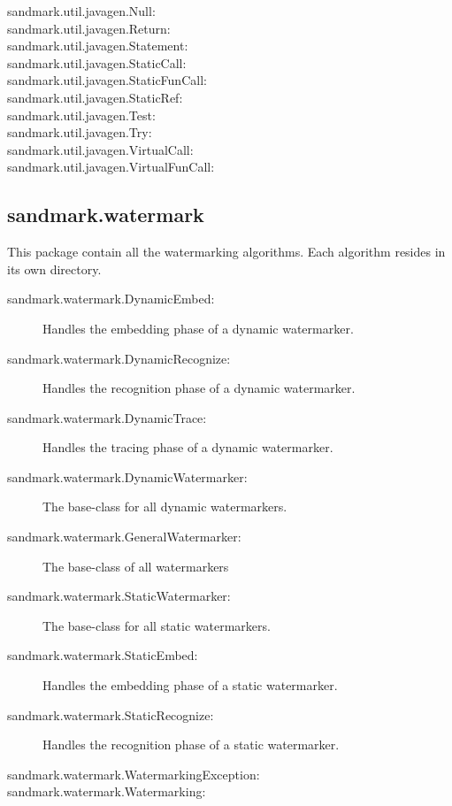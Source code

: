 \begin{description}
   \item[sandmark.util.javagen.Null:]
   \item[sandmark.util.javagen.Return:]
   \item[sandmark.util.javagen.Statement:]
   \item[sandmark.util.javagen.StaticCall:]
   \item[sandmark.util.javagen.StaticFunCall:]
   \item[sandmark.util.javagen.StaticRef:]
   \item[sandmark.util.javagen.Test:]
   \item[sandmark.util.javagen.Try:]
   \item[sandmark.util.javagen.VirtualCall:]
   \item[sandmark.util.javagen.VirtualFunCall:]
\end{description}

\subsection{sandmark.watermark}
This package contain all the watermarking algorithms.
Each algorithm resides in its own directory.
\begin{description}
   \item[sandmark.watermark.DynamicEmbed:]
      Handles the embedding phase of a dynamic watermarker.
   \item[sandmark.watermark.DynamicRecognize:]
      Handles the recognition phase of a dynamic watermarker.
   \item[sandmark.watermark.DynamicTrace:]
      Handles the tracing phase of a dynamic watermarker.
   \item[sandmark.watermark.DynamicWatermarker:]
      The base-class for all dynamic watermarkers.
   \item[sandmark.watermark.GeneralWatermarker:]
      The base-class of all watermarkers
   \item[sandmark.watermark.StaticWatermarker:]
      The base-class for all static watermarkers.
   \item[sandmark.watermark.StaticEmbed:]
      Handles the embedding phase of a static watermarker.
   \item[sandmark.watermark.StaticRecognize:]
      Handles the recognition phase of a static watermarker.
   \item[sandmark.watermark.WatermarkingException:]
   \item[sandmark.watermark.Watermarking:]
\end{description}

